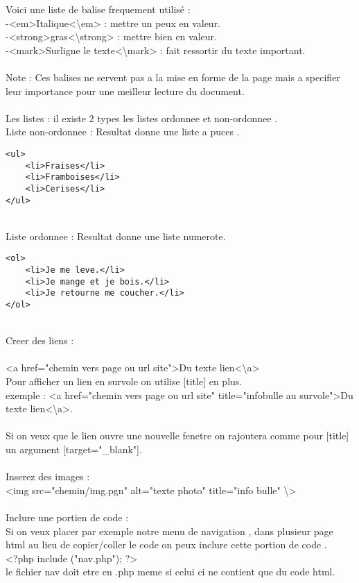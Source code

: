 \documentclass[a4paper,12pt]{book}
\begin{document}
Voici une liste de balise frequement utilisé : \\
-<em>Italique<\textbackslash em> : mettre un peux en valeur.\\
-<strong>gras<\textbackslash strong> : mettre bien en valeur.\\
-<mark>Surligne le texte<\textbackslash mark> : fait ressortir du texte important.\\
\\
Note : Ces balises ne servent pas a la mise en forme de la page mais a specifier leur importance pour une meilleur lecture du document.\\
\\
Les listes : il existe 2 types les listes ordonnee et non-ordonnee .\\
Liste non-ordonnee : Resultat donne une liste a puces .\\
\begin{DDbox}{\linewidth}
\begin{lstlisting}
<ul>
    <li>Fraises</li>
    <li>Framboises</li>
    <li>Cerises</li>
</ul>
\end{lstlisting}
\end{DDbox}{\linewidth}
\\
Liste ordonnee : Resultat donne une liste numerote.\\
\begin{DDbox}{\linewidth}
\begin{lstlisting}
<ol>
    <li>Je me leve.</li>
    <li>Je mange et je bois.</li>
    <li>Je retourne me coucher.</li>
</ol>
\end{lstlisting}
\end{DDbox}{\linewidth}
\\
Creer des liens :\\
\\
<a href="chemin vers page ou url site">Du texte lien<\textbackslash a>
\\
Pour afficher un lien en survole on utilise [title] en plus.\\
exemple : <a href="chemin vers page ou url site" title="infobulle au survole">Du texte lien<\textbackslash a>.\\
\\
Si on veux que le lien ouvre une nouvelle fenetre on rajoutera comme pour [title] un argument [target="_blank"].\\
\\
Inserez des images : \\
<img src="chemin/img.pgn" alt="texte photo" title="info bulle" \textbackslash> \\
\\
Inclure une portien de code :\\
Si on veux placer par exemple notre menu de navigation , dans plusieur page html au lieu de copier/coller le code on peux inclure cette portion de code .\\
<?php include ("nav.php"); ?> \\
le fichier nav doit etre en .php meme si celui ci ne contient que du code html.\\
\end{document}
